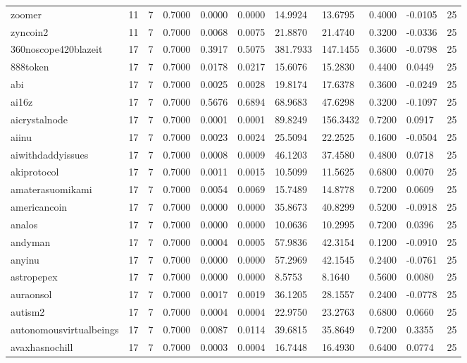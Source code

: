 \begin{table}[htbp]
\begin{tabular}{lllllllllll}
zoomer & 11 & 7 & 0.7000 & 0.0000 & 0.0000 & 14.9924 & 13.6795 & 0.4000 & -0.0105 & 25 \\
zyncoin2 & 11 & 7 & 0.7000 & 0.0068 & 0.0075 & 21.8870 & 21.4740 & 0.3200 & -0.0336 & 25 \\
360noscope420blazeit & 17 & 7 & 0.7000 & 0.3917 & 0.5075 & 381.7933 & 147.1455 & 0.3600 & -0.0798 & 25 \\
888token & 17 & 7 & 0.7000 & 0.0178 & 0.0217 & 15.6076 & 15.2830 & 0.4400 & 0.0449 & 25 \\
abi & 17 & 7 & 0.7000 & 0.0025 & 0.0028 & 19.8174 & 17.6378 & 0.3600 & -0.0249 & 25 \\
ai16z & 17 & 7 & 0.7000 & 0.5676 & 0.6894 & 68.9683 & 47.6298 & 0.3200 & -0.1097 & 25 \\
aicrystalnode & 17 & 7 & 0.7000 & 0.0001 & 0.0001 & 89.8249 & 156.3432 & 0.7200 & 0.0917 & 25 \\
aiinu & 17 & 7 & 0.7000 & 0.0023 & 0.0024 & 25.5094 & 22.2525 & 0.1600 & -0.0504 & 25 \\
aiwithdaddyissues & 17 & 7 & 0.7000 & 0.0008 & 0.0009 & 46.1203 & 37.4580 & 0.4800 & 0.0718 & 25 \\
akiprotocol & 17 & 7 & 0.7000 & 0.0011 & 0.0015 & 10.5099 & 11.5625 & 0.6800 & 0.0070 & 25 \\
amaterasuomikami & 17 & 7 & 0.7000 & 0.0054 & 0.0069 & 15.7489 & 14.8778 & 0.7200 & 0.0609 & 25 \\
americancoin & 17 & 7 & 0.7000 & 0.0000 & 0.0000 & 35.8673 & 40.8299 & 0.5200 & -0.0918 & 25 \\
analos & 17 & 7 & 0.7000 & 0.0000 & 0.0000 & 10.0636 & 10.2995 & 0.7200 & 0.0396 & 25 \\
andyman & 17 & 7 & 0.7000 & 0.0004 & 0.0005 & 57.9836 & 42.3154 & 0.1200 & -0.0910 & 25 \\
anyinu & 17 & 7 & 0.7000 & 0.0000 & 0.0000 & 57.2969 & 42.1545 & 0.2400 & -0.0761 & 25 \\
astropepex & 17 & 7 & 0.7000 & 0.0000 & 0.0000 & 8.5753 & 8.1640 & 0.5600 & 0.0080 & 25 \\
auraonsol & 17 & 7 & 0.7000 & 0.0017 & 0.0019 & 36.1205 & 28.1557 & 0.2400 & -0.0778 & 25 \\
autism2 & 17 & 7 & 0.7000 & 0.0004 & 0.0004 & 22.9750 & 23.2763 & 0.6800 & 0.0660 & 25 \\
autonomousvirtualbeings & 17 & 7 & 0.7000 & 0.0087 & 0.0114 & 39.6815 & 35.8649 & 0.7200 & 0.3355 & 25 \\
avaxhasnochill & 17 & 7 & 0.7000 & 0.0003 & 0.0004 & 16.7448 & 16.4930 & 0.6400 & 0.0774 & 25 \\

\end{tabular}
\end{table}
